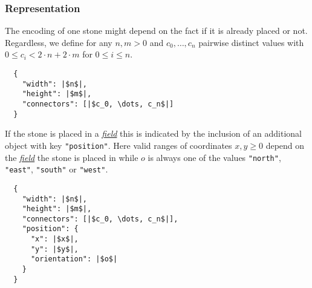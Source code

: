 \documentclass{scrartcl}
\begin{document}
\subsubsection{Representation}
The encoding of one stone might depend on the fact if it is already placed or 
not. Regardless, we define for any $n,m > 0$ and $c_{0}, \dots, c_{n}$ pairwise
distinct values with $0 \leq c_{i} < 2\cdot n + 2\cdot m$ for $0\leq i\leq n$.
\begin{verbatim}
  {
    "width": |$n$|,
    "height": |$m$|,
    "connectors": [|$c_0, \dots, c_n$|]
  }
\end{verbatim}
If the stone is placed in a \hyperlink{field}{\emph{field}} this is indicated 
by the inclusion of an additional object with key 
\texttt{"position"}. Here valid ranges of coordinates $x, y \geq 0$ 
depend on the \hyperlink{field}{\emph{field}} the stone is placed in while $o$ 
is always one of the values \texttt{"north"}, 
\texttt{"east"}, \texttt{"south"} or 
\texttt{"west"}.
\begin{verbatim}
  {
    "width": |$n$|,
    "height": |$m$|,
    "connectors": [|$c_0, \dots, c_n$|],
    "position": {
      "x": |$x$|,
      "y": |$y$|,
      "orientation": |$o$|
    }
  }
\end{verbatim}
\end{document}

